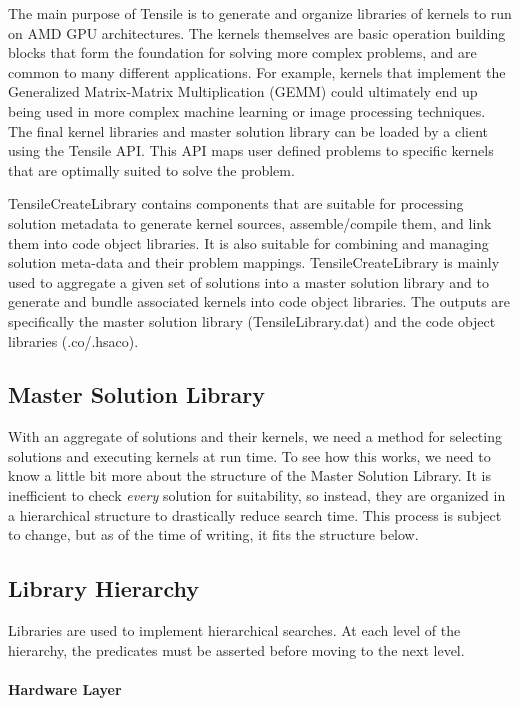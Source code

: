 \documentclass[]{article}
\begin{document}
The main purpose of Tensile is to generate and organize libraries of kernels to run on AMD GPU architectures. The kernels themselves are basic operation building blocks that form the foundation for solving more complex problems, and are common to many different applications. For example, kernels that implement the Generalized Matrix-Matrix Multiplication (GEMM) could ultimately end up being used in more complex machine learning or image processing techniques.
The final kernel libraries and master solution library can be loaded by a client using the Tensile API. This API maps user defined problems to specific kernels that are optimally suited to solve the problem.

TensileCreateLibrary contains components that are suitable for processing solution metadata to generate kernel sources, assemble/compile them, and link them into code object libraries. It is also suitable for combining and managing solution meta-data and their problem mappings. TensileCreateLibrary is mainly used to aggregate a given set of solutions into a master solution library and to generate and bundle associated kernels into code object libraries. The outputs are specifically the master solution library (TensileLibrary.dat) and the code object libraries (.co/.hsaco).

\subsection{Master Solution Library}

With an aggregate of solutions and their kernels, we need a method for selecting solutions and executing kernels at run time. To see how this works, we need to know a little bit more about the structure of the Master Solution Library. It is inefficient to check \textit{every} solution for suitability, so instead, they are organized in a hierarchical structure to drastically reduce search time. This process is subject to change, but as of the time of writing, it fits the structure below.

\subsection{Library Hierarchy}

Libraries are used to implement hierarchical searches. At each level of the hierarchy, the predicates must be asserted before moving to the next level. 

\paragraph{Hardware Layer}
\end{document}
